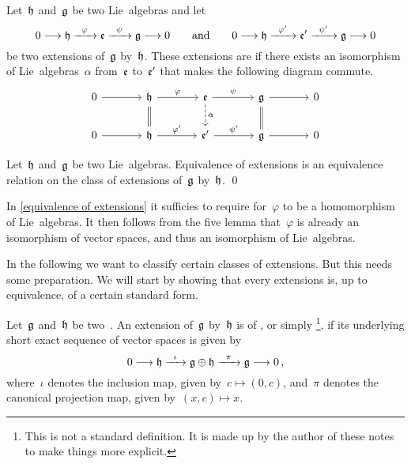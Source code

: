 \begin{definition}
	\label{equivalence of extensions}
	Let~$\mathfrak{h}$ and~$\mathfrak{g}$ be two Lie~algebras and let
	\[
		0 
		\to
		\hlie
		\xto{\varphi}
		\elie
		\xto{\psi}
		\glie
		\to
		0
		\qquad\text{and}\qquad
		0 
		\to
		\hlie
		\xto{\varphi'}
		\elie'
		\xto{\psi'}
		\glie
		\to
		0
	\]
	be two extensions of~$\mathfrak{g}$ by~$\mathfrak{h}$.
	These extensions are  if there exists an isomorphism of Lie~algebras~$\alpha$ from~$\mathfrak{e}$ to~$\mathfrak{e}'$ that makes the following diagram commute.
	\[
		\begin{tikzcd}[column sep = large]
			0
			\arrow{r}
			&
			\hlie
			\arrow{r}[above]{\varphi}
			\arrow[equal]{d}
			&
			\elie
			\arrow{r}[above]{\psi}
			\arrow[dashed]{d}[right]{\alpha}
			&
			\glie
			\arrow{r}
			\arrow[equal]{d}
			&
			0
			\\
			0
			\arrow{r}
			&
			\hlie
			\arrow{r}[above]{\varphi'}
			&
			\elie'
			\arrow{r}[above]{\psi'}
			&
			\glie
			\arrow{r}
			&
			0
		\end{tikzcd}
	\]
\end{definition}


\begin{proposition}
	Let~$\mathfrak{h}$ and~$\mathfrak{g}$ be two Lie~algebras.
	Equivalence of extensions is an equivalence relation on the class of extensions of~$\mathfrak{g}$ by~$\mathfrak{h}$.
	\qed
\end{proposition}


\begin{remark}
	In \cref{equivalence of extensions} it sufficies to require for~$\varphi$ to be a homomorphism of Lie~algebras.
	It then follows from the five lemma that~$\varphi$ is already an isomorphism of vector spaces, and thus an isomorphism of Lie~algebras.
\end{remark}


\begin{fluff}
	In the following we want to classify certain classes of extensions.
	But this needs some preparation.
	We will start by showing that every extensions is, up to equivalence, of a certain standard form.
\end{fluff}


\begin{definition}
	Let~$\mathfrak{g}$ and~$\mathfrak{h}$ be two~\liealgebras{$\kf$}.
	An extension of~$\mathfrak{g}$ by~$\mathfrak{h}$ is of , or simply %
	\footnote{
		This is not a standard definition.
		It is made up by the author of these notes to make things more explicit.
	}, if its underlying short exact sequence of vector spaces is given by
	\[
		0
		\to
		\hlie
		\xto{\iota}
		\glie \oplus \hlie
		\xto{\pi}
		\glie
		\to
		0 \,,
	\]
	where~$\iota$ denotes the inclusion map, given by~$c \mapsto (0,c)$, and~$\pi$ denotes the canonical projection map, given by~$(x,c) \mapsto x$.
\end{definition}


